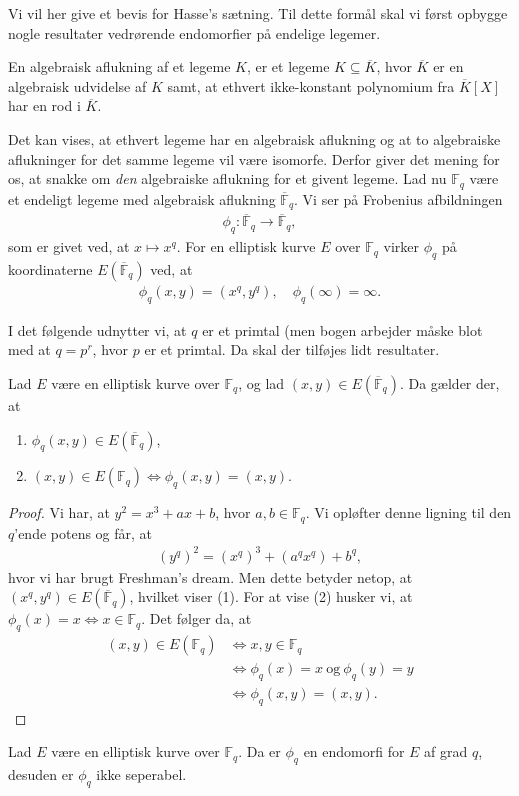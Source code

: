 Vi vil her give et bevis for Hasse's sætning. Til dette
formål skal vi først opbygge nogle resultater vedrørende
endomorfier på endelige legemer.

\begin{definition}
En algebraisk aflukning af et legeme $K$, er et legeme
$K \subseteq \overline{K}$, hvor $\overline{K}$ er en 
algebraisk udvidelse af $K$ samt, at ethvert ikke-konstant
polynomium fra $\overline{K}[X]$ har en rod i $\overline{K}$. 
\end{definition}

Det kan vises, at ethvert legeme har en algebraisk aflukning og
at to algebraiske aflukninger for det samme legeme vil være isomorfe.
Derfor giver det mening for os, at snakke om \emph{den} algebraiske
aflukning for et givent legeme. Lad nu $\mathbb{F}_q$ være et endeligt
legeme med algebraisk aflukning $\overline{\mathbb{F}}_q$. Vi ser på
Frobenius afbildningen 
\begin{align*}
	\phi_q : \overline{\mathbb{F}}_q \to \overline{\mathbb{F}}_q,
\end{align*}
som er givet ved, at $x \mapsto x^q$. For en elliptisk kurve $E$ over
$\mathbb{F}_q$ virker $\phi_q$ på koordinaterne $E(\overline{\mathbb{F}}_q)$ 
ved, at 
\begin{align*}
	\phi_q(x, y) = (x^q, y^q), \quad \phi_q (\infty) = \infty.
\end{align*}

I det følgende udnytter vi, at $q$ er et primtal (men bogen arbejder
måske blot med at $q = p^r$, hvor $p$ er et primtal. Da skal der tilføjes
lidt resultater.

\begin{lemma}
Lad $E$ være en elliptisk kurve over $\mathbb{F}_q$, og lad 
$(x, y) \in E(\overline{\mathbb{F}}_q)$. Da gælder der, at 
\begin{enumerate}
	\item $\phi_q(x, y) \in E(\overline{\mathbb{F}}_q)$,
	\item $(x, y) \in E(\mathbb{F}_q) \Leftrightarrow \phi_q(x, y)=(x, y)$.
\end{enumerate}
\end{lemma}
\begin{proof}
Vi har, at $y^2 = x^3 + ax + b$, hvor $a, b \in \mathbb{F}_q$. Vi opløfter 
denne ligning til den $q$'ende potens og får, at 
\begin{align*}
	(y^q)^2 = (x^q)^3 + (a^q x^q) + b^q,
\end{align*}
hvor vi har brugt Freshman's dream. Men dette betyder netop, at 
$(x^q, y^q) \in E(\overline{\mathbb{F}}_q)$, hvilket viser (1).
For at vise (2) husker vi, at $\phi_q(x) = x \Leftrightarrow x \in \mathbb{F}_q$.
Det følger da, at 
\begin{align*}
	(x, y) \in E(\mathbb{F}_q) &\Leftrightarrow x, y \in \mathbb{F}_q \\
	&\Leftrightarrow \phi_q(x) = x \ \text{og} \ \phi_q(y) = y \\
	&\Leftrightarrow \phi_q(x, y) = (x, y).
\end{align*}
\end{proof}


\begin{lemma}
Lad $E$ være en elliptisk kurve over $\mathbb{F}_q$. Da er $\phi_q$ en 
endomorfi for $E$ af grad $q$, desuden er $\phi_q$ ikke seperabel.
\end{lemma}